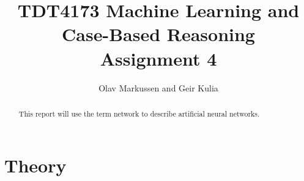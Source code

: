 \documentclass{article}
\begin{document}
\title{TDT4173 Machine Learning and Case-Based Reasoning \\ Assignment 4}

\author{Olav Markussen and Geir Kulia}

\maketitle

\begin{abstract}
This report will use the term network to describe artificial neural networks. 
\end{abstract}

\section{Theory}
	\label{sec:theory}
	

{}

\end{document}
